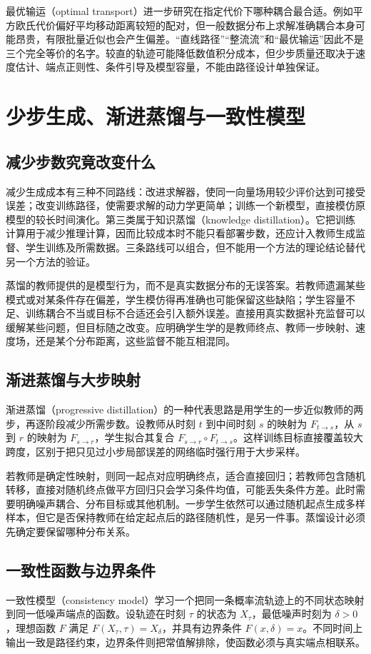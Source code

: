 \documentclass[UTF8,12pt,a4paper,fontset=fandol]{ctexart}
\begin{document}
最优输运（optimal transport）进一步研究在指定代价下哪种耦合最合适。例如平方欧氏代价偏好平均移动距离较短的配对，但一般数据分布上求解准确耦合本身可能昂贵，有限批量近似也会产生偏差。“直线路径”“整流流”和“最优输运”因此不是三个完全等价的名字。较直的轨迹可能降低数值积分成本，但少步质量还取决于速度估计、端点正则性、条件引导及模型容量，不能由路径设计单独保证。

\section{少步生成、渐进蒸馏与一致性模型}
\label{sec:diff-distill}
\subsection{减少步数究竟改变什么}
减少生成成本有三种不同路线：改进求解器，使同一向量场用较少评价达到可接受误差；改变训练路径，使需要求解的动力学更简单；训练一个新模型，直接模仿原模型的较长时间演化。第三类属于知识蒸馏（knowledge distillation）。它把训练计算用于减少推理计算，因而比较成本时不能只看部署步数，还应计入教师生成监督、学生训练及所需数据。三条路线可以组合，但不能用一个方法的理论结论替代另一个方法的验证。

蒸馏的教师提供的是模型行为，而不是真实数据分布的无误答案。若教师遗漏某些模式或对某条件存在偏差，学生模仿得再准确也可能保留这些缺陷；学生容量不足、训练耦合不当或目标不合适还会引入额外误差。直接用真实数据补充监督可以缓解某些问题，但目标随之改变。应明确学生学的是教师终点、教师一步映射、速度场，还是某个分布距离，这些监督不能互相混同。

\subsection{渐进蒸馏与大步映射}
渐进蒸馏（progressive distillation）的一种代表思路是用学生的一步近似教师的两步，再逐阶段减少所需步数\cite{salimans2022}。设教师从时刻 $t$ 到中间时刻 $s$ 的映射为 $F_{t\to s}$，从 $s$ 到 $r$ 的映射为 $F_{s\to r}$，学生拟合其复合 $F_{s\to r}\circ F_{t\to s}$。这样训练目标直接覆盖较大跨度，区别于把只见过小步局部误差的网络临时强行用于大步采样。

若教师是确定性映射，则同一起点对应明确终点，适合直接回归；若教师包含随机转移，直接对随机终点做平方回归只会学习条件均值，可能丢失条件方差。此时需要明确噪声耦合、分布目标或其他机制。一步学生依然可以通过随机起点生成多样样本，但它是否保持教师在给定起点后的路径随机性，是另一件事。蒸馏设计必须先确定要保留哪种分布关系。

\subsection{一致性函数与边界条件}
一致性模型（consistency model）学习一个把同一条概率流轨迹上的不同状态映射到同一低噪声端点的函数\cite{song2023consistency}。设轨迹在时刻 $\tau$ 的状态为 $X_\tau$，最低噪声时刻为 $\delta>0$，理想函数 $F$ 满足 $F(X_\tau,\tau)=X_\delta$，并具有边界条件 $F(x,\delta)=x$。不同时间上输出一致是路径约束，边界条件则把常值解排除，使函数必须与真实端点相联系。
\end{document}
